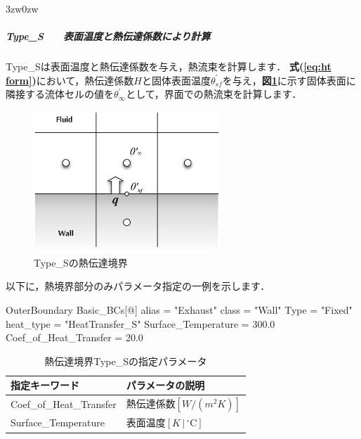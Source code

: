 \vspace{5mm}
\begin{indentation}{3zw}{0zw}

%
\subparagraph{Type\_S　　表面温度と熱伝達係数により計算}
Type\_Sは表面温度と熱伝達係数を与え，熱流束を計算します．
\textbf{式(\ref{eq:ht form})}において，熱伝達係数$H$と固体表面温度$\theta_{sf}^{\prime}$を与え，\textbf{図\ref{fig:HT_Type_S}}に示す固体表面に隣接する流体セルの値を$\theta_{\infty}^{\prime}$として，界面での熱流束を計算します．

\begin{figure}[htdp]
\begin{center}
\includegraphics[width=7cm,clip]{HeatTransfer_Type_S.eps}
\end{center}
\caption{Type\_Sの熱伝達境界}
\label{fig:HT_Type_S}
\end{figure}

以下に，熱境界部分のみパラメータ指定の一例を示します．

{\small
\begin{program}
OuterBoundary {
  Basic_BCs[@] {
    alias                 = "Exhaust"
    class                 = "Wall"
    Type                  = "Fixed"
    heat_type             = "HeatTransfer_S"
    Surface_Temperature   = 300.0
    Coef_of_Heat_Transfer = 20.0
  }
}
\end{program}
}

\begin{table}[htdp]
\caption{熱伝達境界Type\_Sの指定パラメータ}
\begin{center}
\small
\begin{tabular}{ll} \toprule
指定キーワード & パラメータの説明\\ \midrule
Coef\_of\_Heat\_Transfer & 熱伝達係数$[W/(m^2K)]$\\
Surface\_Temperature & 表面温度$[K\,|\,{}^\circ\mathrm{C}]$\\
\bottomrule
\end{tabular}
\end{center}
\label{tbl:hts}
\end{table}


\end{indentation}
